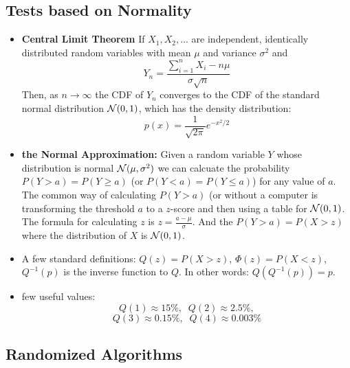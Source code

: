 \documentclass[10pt,twocolumn]{article}
\begin{document}
\subsection*{Tests based on Normality}
\begin{itemize}
\item {\bf Central Limit Theorem} If $X_1,X_2,...$ are independent,
  identically distributed random variables with mean $\mu$ and
  variance $\sigma^2$ and
\[
Y_n=\frac{\sum_{i=1}^n X_i -n\mu}{\sigma\sqrt{n}} 
\]
Then, as $n \to \infty$ the CDF of $Y_n$ converges to the CDF of the
standard normal distribution ${\cal N}(0,1)$, which has the density distribution:
\[
p(x) = \frac{1}{\sqrt{2 \pi}}e^{-x^2/2}
\]
\item {\bf the Normal Approximation:} Given a random variable $Y$
  whose distribution is normal ${\cal N}(\mu,\sigma^2)$ we can
  calcuate the probability $P(Y>a)=P(Y\geq a)$ (or $P(Y<a)=P(Y\leq
  a)$) for any value of $a$. The common way of calculating $P(Y>a)$ (or
  without a computer is transforming the threshold $a$ to a $z$-score and then using
  a table for ${\cal N}(0,1)$. The formula for calculating $z$ is
  $z=\frac{a-\mu}{\sigma}$. And the $P(Y>a)=P(X>z)$ where the
  distribution of $X$ is  ${\cal N}(0,1)$. \\
\item A few standard definitions: $Q(z)=P(X>z)$, $\Phi(z) = P(X<z)$,
  $Q^{-1}(p)$ is the inverse function to $Q$. In other words: $Q(Q^{-1}(p))=p$.
\item few useful values: 
$$ Q(1)\approx 15\%,\;\; Q(2) \approx 2.5\%,$$
$$ Q(3) \approx 0.15\%,\;\; Q(4) \approx 0.003\%$$
\end{itemize}

\subsection*{Randomized Algorithms}
\end{document}
